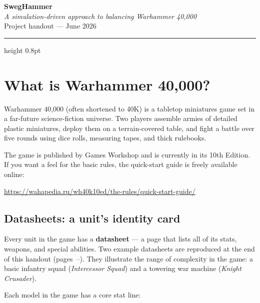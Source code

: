 \documentclass[11pt,a4paper]{article}
\begin{document}
\begin{center}
  {\Huge\bfseries\color{simblue} SwegHammer}\\[6pt]
  {\large\itshape A simulation-driven approach to balancing Warhammer 40,000}\\[4pt]
  {\small\color{greytext} Project handout — June 2026}
\end{center}

\vspace{4mm}
\hrule height 0.8pt
\vspace{6mm}

\section{What is Warhammer 40,000?}

Warhammer 40,000 (often shortened to 40K) is a tabletop miniatures game set
in a far-future science-fiction universe. Two players assemble armies of
detailed plastic miniatures, deploy them on a terrain-covered table, and
fight a battle over five rounds using dice rolls, measuring tapes, and thick
rulebooks.

The game is published by Games Workshop and is currently in its 10th Edition.
If you want a feel for the basic rules, the quick-start guide is freely
available online:

\begin{center}
  \url{https://wahapedia.ru/wh40k10ed/the-rules/quick-start-guide/}
\end{center}

\subsection{Datasheets: a unit's identity card}

Every unit in the game has a \textbf{datasheet} --- a page that lists all of
its stats, weapons, and special abilities. Two example datasheets are
reproduced at the end of this handout (pages~\pageref{sec:datasheets}--\pageref{sec:datasheets-end}).
They illustrate the range of complexity in the game: a basic infantry squad
(\textit{Intercessor Squad}) and a towering war machine (\textit{Knight
Crusader}).

Each model in the game has a core stat line:
\end{document}
